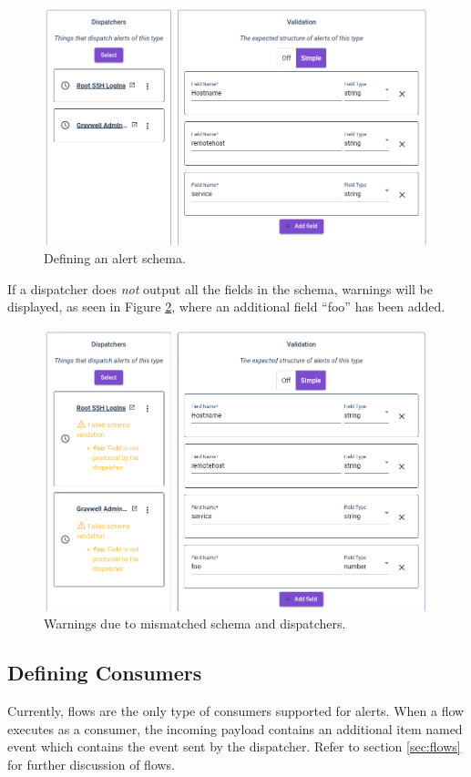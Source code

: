 \begin{figure}
	\includegraphics[width=0.8\linewidth]{images/alert-schema.png}
	\caption{Defining an alert schema.}
	\label{fig:alert-schema}
\end{figure}

If a dispatcher does \emph{not} output all the fields in the schema, warnings will be displayed, as seen in Figure \ref{fig:schema-warning}, where an additional field ``foo'' has been added.

\begin{figure}
	\includegraphics[width=0.8\linewidth]{images/schema-warning.png}
	\caption{Warnings due to mismatched schema and dispatchers.}
	\label{fig:schema-warning}
\end{figure}

\clearpage
\subsection{Defining Consumers}
Currently, flows are the only type of consumers supported for alerts. When a flow executes as a consumer, the incoming payload contains an additional item named event which contains the event sent by the dispatcher. Refer to section \ref{sec:flows} for further discussion of flows.

